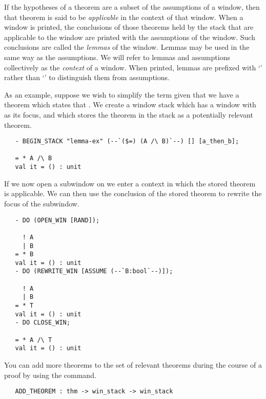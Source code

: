 If the hypotheses of a theorem are a subset of the assumptions of a window,
then that theorem is said to be {\it applicable\/} in the context of that
window.
When a window is printed, the conclusions of those theorems held
by the stack that are applicable to the window are printed 
with the assumptions of the window.
Such conclusions are called the
{\it lemmas}\/ of the window.
Lemmas may be used in the same way as the assumptions.
We will refer to lemmas and assumptions collectively as the {\it context}
of a window.
When printed, lemmas are prefixed with
`\ml{|}' rather than `\ml{!}' to
distinguish them from assumptions.

As an example,
suppose we wish to simplify the term  given that we 
have a theorem  which states that .
We create a window stack which has a window with  as its
focus, and which stores the theorem  in the stack as a
potentially relevant theorem.
\setcounter{sessioncount}{1}
\begin{session}\begin{verbatim}
   - BEGIN_STACK "lemma-ex" (--`($=) (A /\ B)`--) [] [a_then_b];
   
   = * A /\ B
   val it = () : unit
\end{verbatim}\end{session}
If we now open a subwindow on  we enter a context in which the
stored theorem is applicable.
We can then use the conclusion of the stored theorem to rewrite the focus
of the subwindow.
\begin{session}\begin{verbatim}
   - DO (OPEN_WIN [RAND]);
   
     ! A
     | B
   = * B
   val it = () : unit
   - DO (REWRITE_WIN [ASSUME (--`B:bool`--)]);
   
     ! A
     | B
   = * T
   val it = () : unit
   - DO CLOSE_WIN;
   
   = * A /\ T
   val it = () : unit
\end{verbatim}\end{session}

You can add more theorems to the set of relevant theorems during the course of
a proof by using the
 command.
\begin{boxed}\begin{verbatim}
   ADD_THEOREM : thm -> win_stack -> win_stack
\end{verbatim}\end{boxed}

